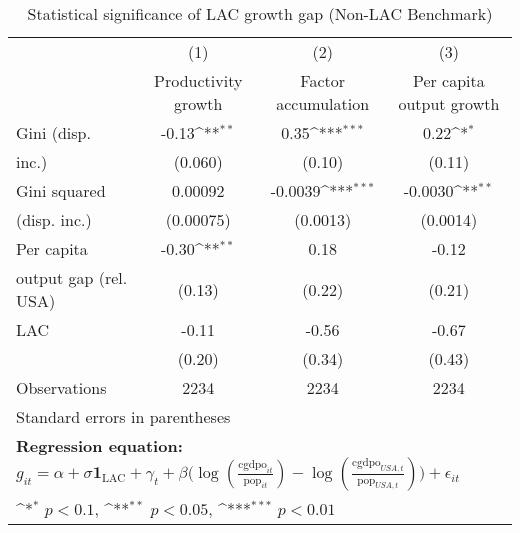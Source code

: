 \begin{table}[htbp]\centering
\def\sym#1{\ifmmode^{#1}\else\(^{#1}\)\fi}
\caption{Statistical significance of LAC growth gap (Non-LAC Benchmark)}
\begin{tabular}{l*{3}{c}}
\toprule
                &\multicolumn{1}{c}{(1)}&\multicolumn{1}{c}{(2)}&\multicolumn{1}{c}{(3)}\\
                &\multicolumn{1}{c}{Productivity growth}&\multicolumn{1}{c}{Factor accumulation}&\multicolumn{1}{c}{Per capita output growth}\\
\midrule
Gini (disp.     &    -0.13\sym{**} &     0.35\sym{***}&     0.22\sym{*}  \\
inc.)           &  (0.060)         &   (0.10)         &   (0.11)         \\
\addlinespace
Gini squared    &  0.00092         &  -0.0039\sym{***}&  -0.0030\sym{**} \\
(disp. inc.)    &(0.00075)         & (0.0013)         & (0.0014)         \\
\addlinespace
Per capita      &    -0.30\sym{**} &     0.18         &    -0.12         \\
output gap (rel. USA)&   (0.13)         &   (0.22)         &   (0.21)         \\
\addlinespace
LAC             &    -0.11         &    -0.56         &    -0.67         \\
                &   (0.20)         &   (0.34)         &   (0.43)         \\
\midrule
Observations    &     2234         &     2234         &     2234         \\
\bottomrule
\multicolumn{4}{l}{\footnotesize Standard errors in parentheses}\\
\multicolumn{4}{l}{\footnotesize \textbf{Regression equation:} \(g_{it} = \alpha + \sigma \mathbf{1}_{\textrm{LAC}} + \gamma_t + \beta \big(\log (\frac{\textrm{cgdpo}_{it}}{\textrm{pop}_{it}} ) - \log (\frac{\textrm{cgdpo}_{USA,t}}{\textrm{pop}_{USA,t}}  ) \big) + \epsilon_{it}\)}\\
\multicolumn{4}{l}{\footnotesize \sym{*} \(p<0.1\), \sym{**} \(p<0.05\), \sym{***} \(p<0.01\)}\\
\end{tabular}
\end{table}
